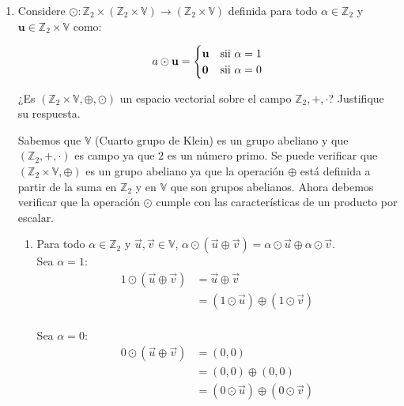 \documentclass{report}
\begin{document}
\begin{enumerate}
\begin{enumerate}
                \item Considere $\odot : \mathbb{Z}_2 \times (\mathbb{Z}_2 \times \mathbb{V}) \rightarrow (\mathbb{Z}_2 \times \mathbb{V})$ definida para todo $\alpha \in \mathbb{Z}_2$ y $\textbf{u} \in \mathbb{Z}_2 \times \mathbb{V}$ como:

                $$
                a \odot \textbf{u} = \begin{cases}
                    \textbf{u} &\text{sii } \alpha = 1\\
                    \textbf{\textbf{0}} &\text{sii } \alpha = 0
                \end{cases}
                $$

                ¿Es $(\mathbb{Z}_2 \times \mathbb{V}, \oplus, \odot)$ un espacio vectorial sobre el campo $\mathbb{Z}_2, +, \cdot$? Justifique su respuesta.

                Sabemos que $\mathbb{V}$ (Cuarto grupo de Klein) es un grupo abeliano y que $(\mathbb{Z}_2, +, \cdot)$ es campo ya que $2$ es un número primo. Se puede verificar que $(\mathbb{Z}_2 \times \mathbb{V}, \oplus)$ es un grupo abeliano ya que la operación $\oplus$ está definida a partir de la suma en $\mathbb{Z}_2$ y en $\mathbb{V}$ que son grupos abelianos. Ahora debemos verificar que la operación $\odot$ cumple con las características de un producto por escalar.

                \begin{enumerate}
                    \item Para todo $\alpha \in \mathbb{Z}_2$ y $\vec{u}, \vec{v} \in \mathbb{V}$, $\alpha \odot (\vec{u} \oplus \vec{v}) = \alpha \odot \vec{u} \oplus \alpha \odot \vec{v}$.\\

                    Sea $\alpha = 1$:
                    \begin{align*}
                        1 \odot (\vec{u} \oplus \vec{v}) &= \vec{u} \oplus \vec{v} \\
                        &= (1 \odot \vec{u}) \oplus (1 \odot \vec{v})
                    \end{align*}\\

                    Sea $\alpha = 0$:
                    \begin{align*}
                        0 \odot (\vec{u} \oplus \vec{v}) &= (0,0) \\
                        &= (0,0) \oplus (0,0)\\
                        &= (0 \odot \vec{u}) \oplus (0 \odot \vec{v})
                    \end{align*}


\end{enumerate}
\end{enumerate}
\end{enumerate}
\end{document}
